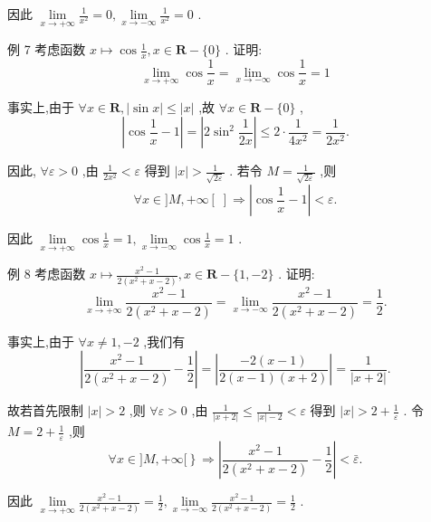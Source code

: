 因此 $\mathop{\lim }\limits_{{x \rightarrow   + \infty }}\frac{1}{{x}^{2}} = 0,\mathop{\lim }\limits_{{x \rightarrow   - \infty }}\frac{1}{{x}^{2}} = 0$ .

例 7 考虑函数 $x \mapsto  \cos \frac{1}{x},x \in  \mathbf{R} - \{ 0\}$ . 证明:
$$\mathop{\lim }\limits_{{x \rightarrow   + \infty }}\cos \frac{1}{x} = \mathop{\lim }\limits_{{x \rightarrow   - \infty }}\cos \frac{1}{x} = 1$$

事实上,由于 $\forall x \in  \mathbf{R},\left| {\sin x}\right|  \leq  \left| x\right|$ ,故 $\forall x \in  \mathbf{R} - \{ 0\}$ ,
$$\left| {\cos \frac{1}{x} - 1}\right|  = \left| {2{\sin }^{2}\frac{1}{2x}}\right|  \leq  2 \cdot  \frac{1}{4{x}^{2}} = \frac{1}{2{x}^{2}}.$$

因此, $\forall \varepsilon  > 0$ ,由 $\frac{1}{2{x}^{2}} < \varepsilon$ 得到 $\left| x\right|  > \frac{1}{\sqrt{2\varepsilon }}$ . 若令 $M = \frac{1}{\sqrt{2\varepsilon }}$ ,则
$$\forall x \in  \rbrack M, + \infty \left\lbrack  \;\right\rbrack   \Rightarrow  \left| {\cos \frac{1}{x} - 1}\right|  < \varepsilon .$$

因此 $\mathop{\lim }\limits_{{x \rightarrow   + \infty }}\cos \frac{1}{x} = 1,\mathop{\lim }\limits_{{x \rightarrow   - \infty }}\cos \frac{1}{x} = 1$ .

例 8 考虑函数 $x \mapsto  \frac{{x}^{2} - 1}{2\left( {{x}^{2} + x - 2}\right) },x \in  \mathbf{R} - \{ 1, - 2\}$ . 证明:
$$\mathop{\lim }\limits_{{x \rightarrow   + \infty }}\frac{{x}^{2} - 1}{2\left( {{x}^{2} + x - 2}\right) } = \mathop{\lim }\limits_{{x \rightarrow   - \infty }}\frac{{x}^{2} - 1}{2\left( {{x}^{2} + x - 2}\right) } = \frac{1}{2}.$$

事实上,由于 $\forall x \neq  1, - 2$ ,我们有
$$\left| {\frac{{x}^{2} - 1}{2\left( {{x}^{2} + x - 2}\right) } - \frac{1}{2}}\right|  = \left| \frac{-2\left( {x - 1}\right) }{2\left( {x - 1}\right) \left( {x + 2}\right) }\right|  = \frac{1}{\left| x + 2\right| }.$$

故若首先限制 $\left| x\right|  > 2$ ,则 $\forall \varepsilon  > 0$ ,由 $\frac{1}{\left| x + 2\right| } \leq  \frac{1}{\left| x\right|  - 2} < \varepsilon$ 得到 $\left| x\right|  > 2 + \frac{1}{\varepsilon }$ . 令 $M = 2 + \frac{1}{\varepsilon }$ ,则
$$\left. {\forall x \in  \rbrack M, + \infty \lbrack }\right\}   \Rightarrow  \left| {\frac{{x}^{2} - 1}{2\left( {{x}^{2} + x - 2}\right) } - \frac{1}{2}}\right|  < \bar{\varepsilon }.$$

因此 $\mathop{\lim }\limits_{{x \rightarrow   + \infty }}\frac{{x}^{2} - 1}{2\left( {{x}^{2} + x - 2}\right) } = \frac{1}{2},\mathop{\lim }\limits_{{x \rightarrow   - \infty }}\frac{{x}^{2} - 1}{2\left( {{x}^{2} + x - 2}\right) } = \frac{1}{2}$ .

